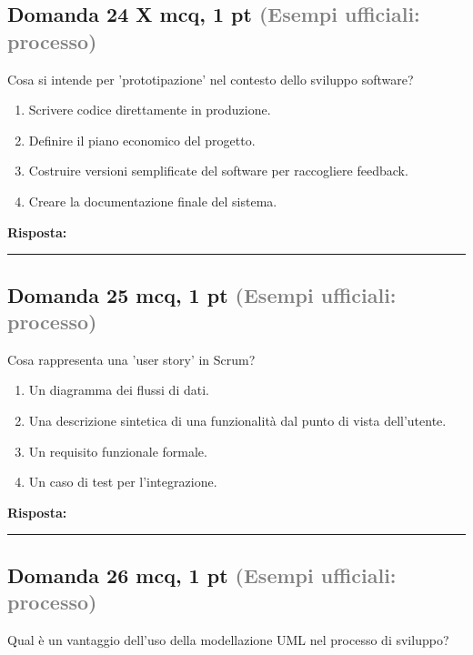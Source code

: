 \documentclass[a4paper,11pt]{article}
\begin{document}
\subsection*{Domanda 24 X \hfill {\small mcq, 1 pt \textcolor{gray}{(Esempi ufficiali: processo)}}}
Cosa si intende per 'prototipazione' nel contesto dello sviluppo software?

\begin{enumerate}[label=\alph*)]
\item Scrivere codice direttamente in produzione.
\item Definire il piano economico del progetto.
\item Costruire versioni semplificate del software per raccogliere feedback.
\item Creare la documentazione finale del sistema.
\end{enumerate}
\vspace{0.2cm}
\noindent\textbf{Risposta:}\par
\vspace{1.5cm}\hrule


\subsection*{Domanda 25 \hfill {\small mcq, 1 pt \textcolor{gray}{(Esempi ufficiali: processo)}}}
Cosa rappresenta una 'user story' in Scrum?

\begin{enumerate}[label=\alph*)]
\item Un diagramma dei flussi di dati.
\item Una descrizione sintetica di una funzionalità dal punto di vista dell'utente.
\item Un requisito funzionale formale.
\item Un caso di test per l'integrazione.
\end{enumerate}
\vspace{0.2cm}
\noindent\textbf{Risposta:}\par
\vspace{1.5cm}\hrule


\subsection*{Domanda 26 \hfill {\small mcq, 1 pt \textcolor{gray}{(Esempi ufficiali: processo)}}}
Qual è un vantaggio dell'uso della modellazione UML nel processo di sviluppo?
\end{document}
